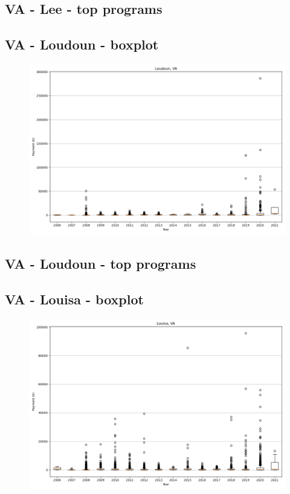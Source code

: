 \subsection*{VA - Lee - top programs}

\newpage
\subsection*{VA - Loudoun - boxplot}
\begin{figure}[h]
\centering
\includegraphics[width=7in]{../output/boxplots/counties/Loudoun-VA_boxplot.png}
\end{figure}


\subsection*{VA - Loudoun - top programs}

\newpage
\subsection*{VA - Louisa - boxplot}
\begin{figure}[h]
\centering
\includegraphics[width=7in]{../output/boxplots/counties/Louisa-VA_boxplot.png}
\end{figure}


